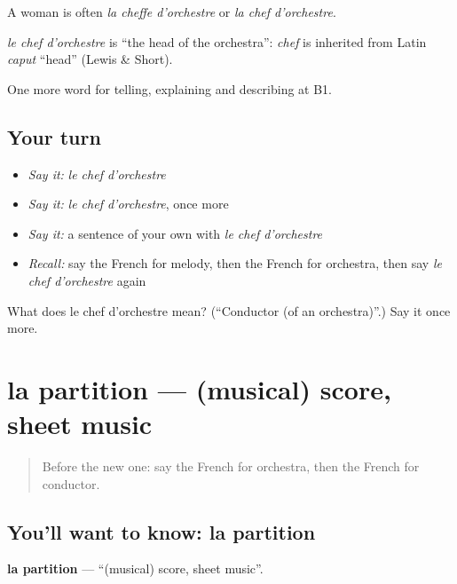 A woman is often \emph{la cheffe d'orchestre} or \emph{la chef d'orchestre}.

\begin{cousinweb}
\emph{le chef d'orchestre} is \textquotedblleft{}the head of the orchestra\textquotedblright{}: \emph{chef} is inherited from Latin \emph{caput} \textquotedblleft{}head\textquotedblright{} (Lewis \& Short).
\end{cousinweb}

\begin{grammarlens}[title={What you've built}]
One more word for telling, explaining and describing at B1.
\end{grammarlens}

\subsection*{Your turn}
\begin{itemize}
\raggedright
  \item \emph{Say it:} \emph{le chef d'orchestre}
  \item \emph{Say it:} \emph{le chef d'orchestre}, once more
  \item \emph{Say it:} a sentence of your own with \emph{le chef d'orchestre}
  \item \emph{Recall:} say the French for melody, then the French for orchestra, then say \emph{le chef d'orchestre} again
\end{itemize}

\begin{tcolorbox}[breakable,colback=teal!4,colframe=teal!35!black,title={Before you move on}]
What does le chef d'orchestre mean? (\textquotedblleft{}Conductor (of an orchestra)\textquotedblright{}.) Say it once more.
\end{tcolorbox}
\section[la partition]{la partition — (musical) score, sheet music}

\label{lesson:FR-C513-partition}



\begin{quote}
Before the new one: say the French for orchestra, then the French for conductor.
\end{quote}

\subsection*{You'll want to know: la partition}
\textbf{la partition} — \textquotedblleft{}(musical) score, sheet music\textquotedblright{}.

